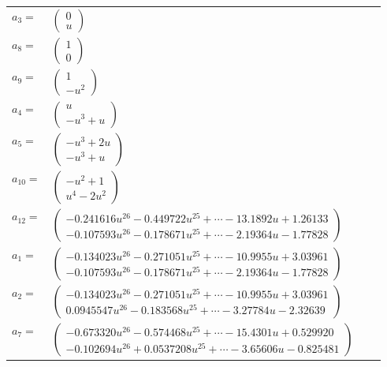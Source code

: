 \documentclass[1p]{elsarticle_modified}
\theoremstyle{definition}
\begin{document}
\begin{tabular}{m{7pt} m{180pt} m{7pt} m{180pt} }
\flushright $a_{3}=$&$\begin{pmatrix}0\\u\end{pmatrix}$ \\
\flushright $a_{8}=$&$\begin{pmatrix}1\\0\end{pmatrix}$ \\
\flushright $a_{9}=$&$\begin{pmatrix}1\\- u^2\end{pmatrix}$ \\
\flushright $a_{4}=$&$\begin{pmatrix}u\\- u^3+u\end{pmatrix}$ \\
\flushright $a_{5}=$&$\begin{pmatrix}- u^3+2 u\\- u^3+u\end{pmatrix}$ \\
\flushright $a_{10}=$&$\begin{pmatrix}- u^2+1\\u^4-2 u^2\end{pmatrix}$ \\
\flushright $a_{12}=$&$\begin{pmatrix}-0.241616 u^{26}-0.449722 u^{25}+\cdots-13.1892 u+1.26133\\-0.107593 u^{26}-0.178671 u^{25}+\cdots-2.19364 u-1.77828\end{pmatrix}$ \\
\flushright $a_{1}=$&$\begin{pmatrix}-0.134023 u^{26}-0.271051 u^{25}+\cdots-10.9955 u+3.03961\\-0.107593 u^{26}-0.178671 u^{25}+\cdots-2.19364 u-1.77828\end{pmatrix}$ \\
\flushright $a_{2}=$&$\begin{pmatrix}-0.134023 u^{26}-0.271051 u^{25}+\cdots-10.9955 u+3.03961\\0.0945547 u^{26}-0.183568 u^{25}+\cdots-3.27784 u-2.32639\end{pmatrix}$ \\
\flushright $a_{7}=$&$\begin{pmatrix}-0.673320 u^{26}-0.574468 u^{25}+\cdots-15.4301 u+0.529920\\-0.102694 u^{26}+0.0537208 u^{25}+\cdots-3.65606 u-0.825481\end{pmatrix}$ \\

\end{tabular}
\end{document}
